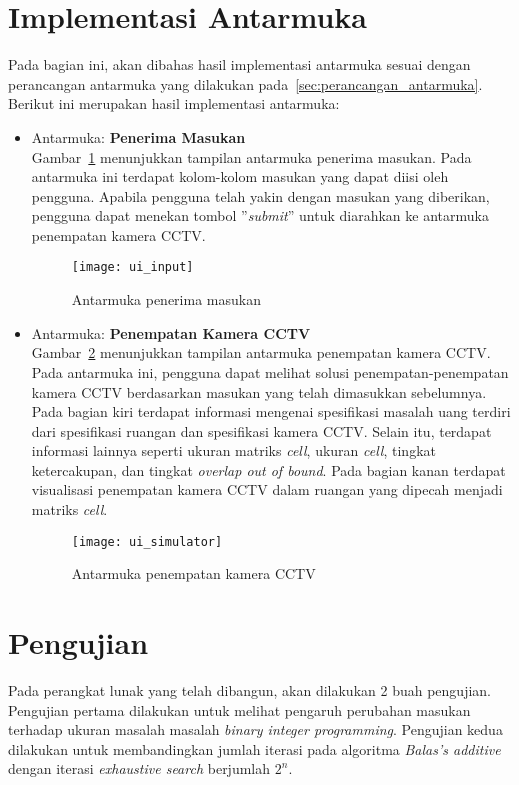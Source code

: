 \section{Implementasi Antarmuka}
Pada bagian ini, akan dibahas hasil implementasi antarmuka sesuai dengan perancangan antarmuka yang dilakukan pada~\ref{sec:perancangan_antarmuka}. Berikut ini merupakan hasil implementasi antarmuka:
\begin{itemize}
	\item Antarmuka: \textbf{Penerima Masukan}\\
	Gambar~\ref{fig:ui_input} menunjukkan tampilan antarmuka penerima masukan. Pada antarmuka ini terdapat kolom-kolom masukan yang dapat diisi oleh pengguna. Apabila pengguna telah yakin dengan masukan yang diberikan, pengguna dapat menekan tombol ''\textit{submit}'' untuk diarahkan ke antarmuka penempatan kamera CCTV.
	\begin{figure}[H]
		\centering  
		\texttt{[image: ui\_input]}
		\caption[Antarmuka penerima masukan]{Antarmuka penerima masukan}
		\label{fig:ui_input}
	\end{figure}
	
	\item Antarmuka: \textbf{Penempatan Kamera CCTV}\\
	Gambar~\ref{fig:ui_simulator} menunjukkan tampilan antarmuka penempatan kamera CCTV. Pada antarmuka ini, pengguna dapat melihat solusi penempatan-penempatan kamera CCTV berdasarkan masukan yang telah dimasukkan sebelumnya. Pada bagian kiri terdapat informasi mengenai spesifikasi masalah uang terdiri dari spesifikasi ruangan dan spesifikasi kamera CCTV. Selain itu, terdapat informasi lainnya seperti ukuran matriks \textit{cell}, ukuran \textit{cell}, tingkat ketercakupan, dan tingkat \textit{overlap out of bound}. Pada bagian kanan terdapat visualisasi penempatan kamera CCTV dalam ruangan yang dipecah menjadi matriks \textit{cell}.
	\begin{figure}[H]
		\centering  
		\texttt{[image: ui\_simulator]}
		\caption[Antarmuka penempatan kamera CCTV]{Antarmuka penempatan kamera CCTV}
		\label{fig:ui_simulator}
	\end{figure}
\end{itemize}

\section{Pengujian}
Pada perangkat lunak yang telah dibangun, akan dilakukan 2 buah pengujian. Pengujian pertama dilakukan untuk melihat pengaruh perubahan masukan terhadap ukuran masalah masalah \textit{binary integer programming}. Pengujian kedua dilakukan untuk membandingkan jumlah iterasi pada algoritma \textit{Balas's additive} dengan iterasi \textit{exhaustive search} berjumlah \(2^n\).

